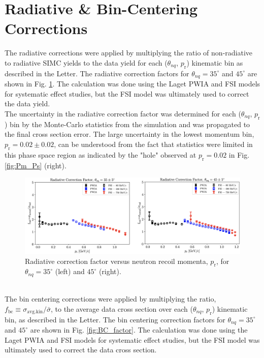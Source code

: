 \documentclass[aps, prl]{revtex4-2}  %
\begin{document}
\section{\large Radiative \& Bin-Centering Corrections}
\indent The radiative corrections were applied by multiplying the ratio of non-radiative to radiative SIMC yields to the data yield for each ($\theta_{nq}$, $p_{\mathrm{r}}$)
kinematic bin as described in the Letter. The radiative correction factors for $\theta_{nq}=35^{\circ}$ and $45^{\circ}$ are shown in Fig. \ref{fig:RC_factor}. The calculation was done using the
Laget PWIA and FSI models for systematic effect studies, but the FSI model was ultimately used to correct the data yield. \\
\indent The uncertainty in the radiative
correction factor was determined for each ($\theta_{nq}$, $p_{\mathrm{r}}$) bin by the Monte-Carlo statistics from the simulation and was propagated to the final cross section error.
The large uncertainty in the lowest momentum bin, $p_{\mathrm{r}} = 0.02\pm0.02$, can be understood from the fact that statistics were limited in this phase space region as indicated by
the "hole" observed at $p_{\mathrm{r}} = 0.02$ in Fig. \ref{fig:Pm_Ps} (right). 
\begin{figure}[!h]
\includegraphics[scale=0.27]{plots/RC_factor.png}
\caption{Radiative correction factor versus neutron recoil momenta, $p_{\mathrm{r}}$, for $\theta_{nq}=35^{\circ}$ (left) and $45^{\circ}$ (right). }
\label{fig:RC_factor}
\end{figure}\\
The bin centering corrections were applied by multiplying the ratio, $f_{\mathrm{bc}} \equiv \sigma_{\mathrm{avg.kin}}/\bar{\sigma}$, to the average data cross section over each ($\theta_{nq}$, $p_{\mathrm{r}}$)
kinematic bin, as described in the Letter. The bin centering correction factors for $\theta_{nq}=35^{\circ}$ and $45^{\circ}$ are shown in
Fig. \ref{fig:BC_factor}. The calculation was done using the Laget PWIA and FSI models for systematic effect studies, but the FSI model was ultimately used to correct the data cross section. \\
\end{document}
